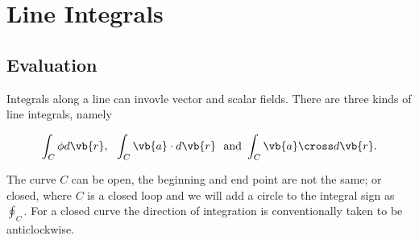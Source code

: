 \documentclass[english,a4paper,12pt]{report}
\begin{document}
\section{Line Integrals}
\subsection{Evaluation}

Integrals along a line can invovle vector and scalar fields. There are three kinds of line integrals, namely

\begin{equation}
	\int_{C}^{} \phi d\vb{r} , ~~ \int_{C}^{} \vb{a} \cdot d\vb{r} ~ \text { and }  \int_{C}^{} \vb{a} \cross d\vb{r} . 
\end{equation}

The curve \(C\) can be open, \ie the beginning and end point are not the same; or closed, where \(C\) is a closed loop and we will add a circle to the integral sign as \(\oint_{C} \). For a closed curve the direction of integration is conventionally taken to be anticlockwise.
\end{document}
